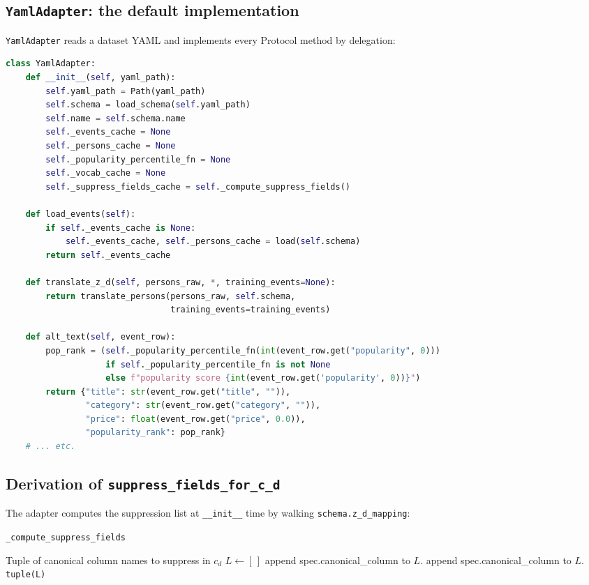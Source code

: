 \documentclass[11pt,a4paper]{article}
\begin{document}
\subsection{\texttt{YamlAdapter}: the default implementation}

\texttt{YamlAdapter} reads a dataset YAML and implements every
Protocol method by delegation:

\begin{lstlisting}[language=Python]
class YamlAdapter:
    def __init__(self, yaml_path):
        self.yaml_path = Path(yaml_path)
        self.schema = load_schema(self.yaml_path)
        self.name = self.schema.name
        self._events_cache = None
        self._persons_cache = None
        self._popularity_percentile_fn = None
        self._vocab_cache = None
        self._suppress_fields_cache = self._compute_suppress_fields()

    def load_events(self):
        if self._events_cache is None:
            self._events_cache, self._persons_cache = load(self.schema)
        return self._events_cache

    def translate_z_d(self, persons_raw, *, training_events=None):
        return translate_persons(persons_raw, self.schema,
                                 training_events=training_events)

    def alt_text(self, event_row):
        pop_rank = (self._popularity_percentile_fn(int(event_row.get("popularity", 0)))
                    if self._popularity_percentile_fn is not None
                    else f"popularity score {int(event_row.get('popularity', 0))}")
        return {"title": str(event_row.get("title", "")),
                "category": str(event_row.get("category", "")),
                "price": float(event_row.get("price", 0.0)),
                "popularity_rank": pop_rank}
    # ... etc.
\end{lstlisting}

\subsection{Derivation of \texttt{suppress\_fields\_for\_c\_d}}

The adapter computes the suppression list at \texttt{\_\_init\_\_} time
by walking \texttt{schema.z\_d\_mapping}:

\begin{algorithm}[H]
\caption{\texttt{\_compute\_suppress\_fields}}
\begin{algorithmic}[1]
\Ensure Tuple of canonical column names to suppress in $c_d$
\State $L \gets [\,]$
    \State append spec.canonical\_column to $L$.
    \State append spec.canonical\_column to $L$.
  \EndIf
\EndFor
\State \Return \texttt{tuple(L)}
\end{algorithmic}
\end{algorithm}
\end{document}
